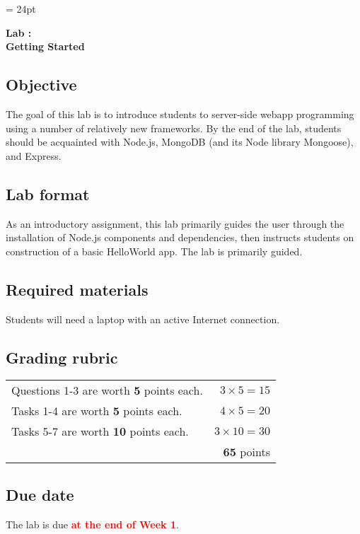 \documentclass{article}
\newcommand{\labduedate}{at the end of Week 1}
\begin{document}
\chead{\textcolor{Gray}{CSSE491 -- Scalable Computing Lab Assignment}}
\headsep = 24pt

\begin{center}
{ \large
\textbf{Lab \labnumber: \longproductname} \\
\textbf{Getting Started}
}
\end{center}

\subsection*{Objective}
The goal of this lab is to introduce students to server-side webapp programming using a number of relatively new frameworks. By the end of the lab, students should be acquainted with Node.js, MongoDB (and its Node library Mongoose), and Express.

\subsection*{Lab format}
As an introductory assignment, this lab primarily guides the user through the installation of Node.js components and dependencies, then instructs students on construction of a basic HelloWorld app. The lab is primarily guided.

\subsection*{Required materials}
Students will need a laptop with an active Internet connection.

\subsection*{Grading rubric}
\begin{tabular}{p{5.5in} r}
Questions 1-3 are worth \textbf{5} points each. & $3 \times 5 = 15$ \\
Tasks 1-4 are worth \textbf{5} points each. & $4 \times 5 = 20$ \\
Tasks 5-7 are worth \textbf{10} points each. & $3 \times 10 = 30$ \\ \hline
& \textbf{65} points
\end{tabular}

\subsection*{Due date}
The lab is due \textcolor{red}{\textbf{\labduedate}}.
\end{document}
